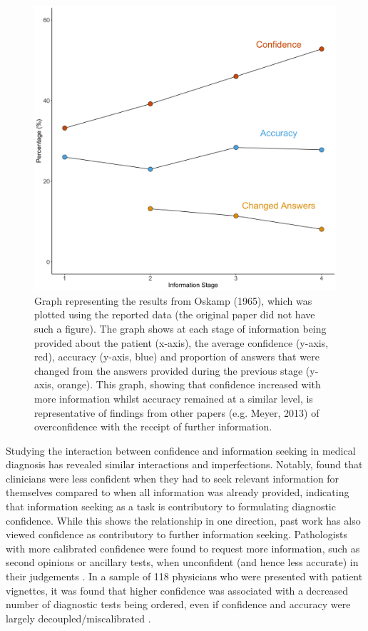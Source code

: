 \documentclass[a4paper, nobind]{templates/ociamthesis}
\begin{document}
\newpage

\begin{figure}[H]

{\centering \includegraphics[width=1\linewidth]{./assets/OskampGraph} 

}

\caption{Graph representing the results from Oskamp (1965), which was plotted using the reported data (the original paper did not have such a figure). The graph shows at each stage of information being provided about the patient (x-axis), the average confidence (y-axis, red), accuracy (y-axis, blue) and proportion of answers that were changed from the answers provided during the previous stage (y-axis, orange). This graph, showing that confidence increased with more information whilst accuracy remained at a similar level, is representative of findings from other papers (e.g. Meyer, 2013) of overconfidence with the receipt of further information.}\label{fig:oskamp}
\end{figure}

Studying the interaction between confidence and information seeking in medical diagnosis has revealed similar interactions and imperfections. Notably, \textcite{gruppen_information_1991} found that clinicians were less confident when they had to seek relevant information for themselves compared to when all information was already provided, indicating that information seeking as a task is contributory to formulating diagnostic confidence. While this shows the relationship in one direction, past work has also viewed confidence as contributory to further information seeking. Pathologists with more calibrated confidence were found to request more information, such as second opinions or ancillary tests, when unconfident (and hence less accurate) in their judgements \autocite{clayton_are_2023}. In a sample of 118 physicians who were presented with patient vignettes, it was found that higher confidence was associated with a decreased number of diagnostic tests being ordered, even if confidence and accuracy were largely decoupled/miscalibrated \autocite{meyer_physicians_2013}.
\end{document}
